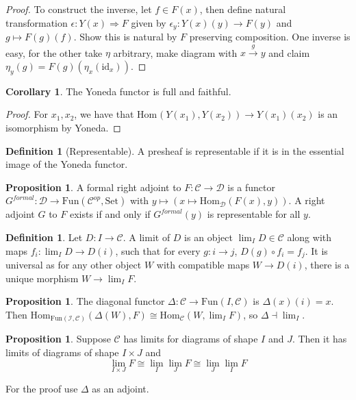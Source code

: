 \documentclass[a4paper,10pt]{article}
\theoremstyle{definition}
\newtheorem{definition}[theorem]{Definition}
\newtheorem{corollary}[theorem]{Corollary}
\newtheorem{proposition}[theorem]{Proposition}
\newcommand{\Hom}[3][C]{\mathrm{Hom}_\mathcal{#1}(#2, #3)}
\newcommand{\C}{\mathcal{C}}
\newcommand{\D}{\mathcal{D}}
\newcommand{\id}{\mathrm{id}}
\newcommand{\Set}{\mathrm{Set}}
\begin{document}
\begin{proof}
    To construct the inverse, let $f \in F(x)$, then define natural transformation $\epsilon \colon Y(x) \Rightarrow F$ given by $\epsilon_y \colon Y(x)(y) \rightarrow F(y)$ and $g \mapsto F(g)(f)$. Show this is natural by $F$ preserving composition. One inverse is easy, for the other take $\eta$ arbitrary, make diagram with $x \xrightarrow{g} y$ and claim $\eta_y(g) = F(g)(\eta_x(\id_x))$.
\end{proof}

\begin{corollary}
    The Yoneda functor is full and faithful.
\end{corollary}
\begin{proof}
    For $x_1, x_2$, we have that $\Hom[{}]{Y({x_1})}{Y(x_2)} \longrightarrow Y(x_1)(x_2)$ is an isomorphism by Yoneda. 
\end{proof}

\begin{definition}[Representable]
    A presheaf is representable if it is in the essential image of the Yoneda functor.
\end{definition}

\begin{proposition}
    A formal right adjoint to $F \colon \C \rightarrow \D$ is a functor $G^{\mathit{formal}} \colon \mathcal{D} \rightarrow \mathrm{Fun}(\C^{op}, \Set)$ with $y \mapsto (x \mapsto \Hom[D]{F(x)}{y})$. A right adjoint $G$ to $F$ exists if and only if $G^{formal}(y)$ is representable for all $y$.
\end{proposition}

\begin{definition}
    Let $D \colon I \rightarrow \C$. A limit of $D$ is an object $\lim_I D \in \C$ along with maps $f_i \colon \lim_I D \rightarrow D(i)$, such that for every $g \colon i \rightarrow j$, $D(g) \circ f_i = f_j$. It is universal as for any other object $W$ with compatible maps $W \rightarrow D(i)$, there is a unique morphism $W \rightarrow \lim_I F$.
\end{definition}

\begin{proposition}
    The diagonal functor $\Delta \colon \C \rightarrow \mathrm{Fun}(I, \C)$ is  $\Delta(x)(i) = x$. Then $\Hom[\mathrm{Fun}(I, \C)]{\Delta(W)}{F} \cong \Hom{W}{\lim_I F}$, so $\Delta \dashv \lim_I$.
\end{proposition}

\begin{proposition}
    Suppose $\C$ has limits for diagrams of shape $I$ and $J$. Then it has limits of diagrams of shape $I \times J$ and 
    \[
        \lim_{I \times J} F \cong \lim_I \lim_J F \cong \lim_J \lim_I F
    \]
\end{proposition}
For the proof use $\Delta$ as an adjoint.
\end{document}
